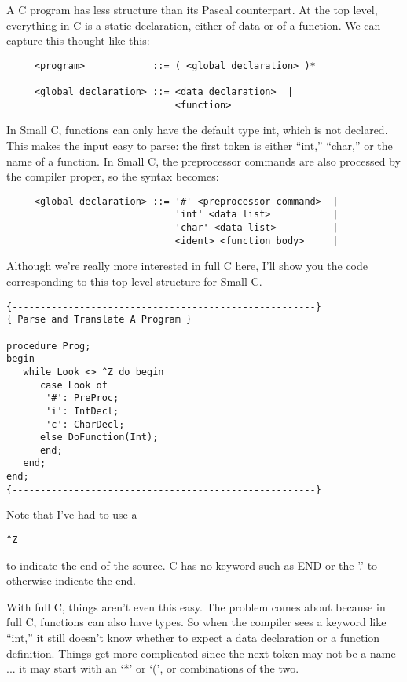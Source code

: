 A C program has  less  structure than its Pascal counterpart. At the top level, everything in C is a static declaration, either of data or of a function. We can capture this thought like this:

\begin{verbatim}
     <program>            ::= ( <global declaration> )*

     <global declaration> ::= <data declaration>  |
                              <function>
\end{verbatim}

In Small C, functions  can  only have the default type int, which is not declared. This makes  the  input easy to parse: the first token is either ``int,'' ``char,'' or the name  of  a  function. In Small  C, the preprocessor commands are  also  processed  by  the compiler proper, so the syntax becomes:

{\small
\begin{verbatim}
     <global declaration> ::= '#' <preprocessor command>  |
                              'int' <data list>           |
                              'char' <data list>          |
                              <ident> <function body>     |
\end{verbatim} }

Although we're really more interested in full C  here, I'll show you the  code corresponding to this top-level structure for Small C.

\begin{verbatim}
{------------------------------------------------------}
{ Parse and Translate A Program }

procedure Prog;
begin
   while Look <> ^Z do begin
      case Look of
       '#': PreProc;
       'i': IntDecl;
       'c': CharDecl;
      else DoFunction(Int);
      end;
   end;
end;
{------------------------------------------------------}
\end{verbatim}

Note that I've had to use a \begin{verbatim}^Z\end{verbatim} to indicate the end of the source. C has no keyword such as END or the '.' to otherwise indicate the end.

With full C, things  aren't  even  this easy. The problem comes about because in full C, functions can also have types. So when the compiler sees a  keyword  like  ``int,''  it still doesn't know whether to expect a  data  declaration  or a function definition. Things get more  complicated  since  the  next token may not be a name  ... it may start with an `*' or `(', or combinations of the two.

